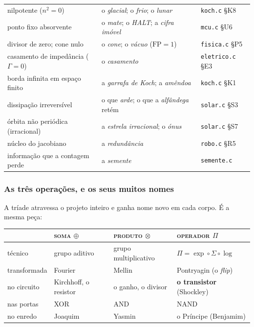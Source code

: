 \documentclass[11pt]{article}
\newcommand{\code}[1]{\texttt{\small #1}}
\theoremstyle{plain}
\theoremstyle{remark}
\begin{document}
\begin{center}
\begin{tabular}{@{}p{4.6cm}p{5.2cm}p{4.8cm}@{}}
nilpotente ($n^2=0$) & o \emph{glacial}; o \emph{frio}; o \emph{lunar} & \code{koch.c} §K8 \\
ponto fixo absorvente & o \emph{mate}; o \emph{HALT}; a \emph{cifra imóvel} & \code{mcu.c} §U6 \\
divisor de zero; cone nulo & o \emph{cone}; o \emph{vácuo} ($\mathrm{FP}=1$) & \code{fisica.c} §P5 \\
casamento de impedância ($\Gamma=0$) & o \emph{casamento} & \code{eletrico.c} §E3 \\
borda infinita em espaço finito & a \emph{garrafa de Koch}; a \emph{amêndoa} & \code{koch.c} §K1 \\
dissipação irreversível & o que \emph{arde}; o que a \emph{alfândega} retém & \code{solar.c} §S3 \\
órbita não periódica (irracional) & a \emph{estrela irracional}; o \emph{ónus} & \code{solar.c} §S7 \\
núcleo do jacobiano & a \emph{redundância} & \code{robo.c} §R5 \\
informação que a contagem perde & a \emph{semente} & \code{semente.c} \\
\bottomrule
\end{tabular}
\end{center}

\subsubsection{As três operações, e os seus muitos nomes}

A tríade atravessa o projeto inteiro e ganha nome novo em cada corpo. É a mesma peça:

\begin{center}\small
\renewcommand{\arraystretch}{1.25}
\begin{tabular}{@{}p{2.6cm}p{3.6cm}p{3.4cm}p{4.4cm}@{}}
\toprule
& \textsc{soma} $\oplus$ & \textsc{produto} $\otimes$ & \textsc{operador} $\Pi$ \\
\midrule
técnico & grupo aditivo & grupo multiplicativo & $\Pi=\exp\circ\Sigma\circ\log$ \\
transformada & Fourier & Mellin & Pontryagin (o \emph{flip}) \\
no circuito & Kirchhoff, o resistor & o ganho, o divisor & \textbf{o transistor} (Shockley) \\
nas portas & XOR & AND & NAND \\
no enredo & Joaquim & Yasmin & o Príncipe (Benjamim) \\
\bottomrule
\end{tabular}
\end{center}
\end{document}
